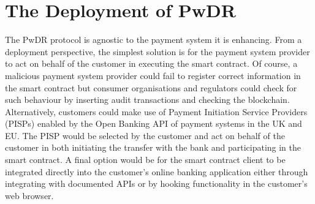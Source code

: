 
\vspace{-3mm}
\section{The Deployment of PwDR}\label{sec::PwDR-deployment}
The PwDR protocol is agnostic to the payment system it is enhancing. From a deployment perspective, the simplest solution is for the payment system provider to act on behalf of the customer in executing the smart contract. Of course, a malicious payment system provider could fail to register correct information in the smart contract but consumer organisations and regulators could check for such behaviour by inserting audit transactions and checking the blockchain. Alternatively, customers could make use of Payment Initiation Service Providers (PISPs) enabled by the Open Banking API of payment systems in the UK and EU. The PISP would be selected by the customer and act on behalf of the customer in both initiating the transfer with the bank and participating in the smart contract. A final option would be for the smart contract client to be integrated directly into the customer’s online banking application either through integrating with documented APIs or by hooking functionality in the customer’s web browser.